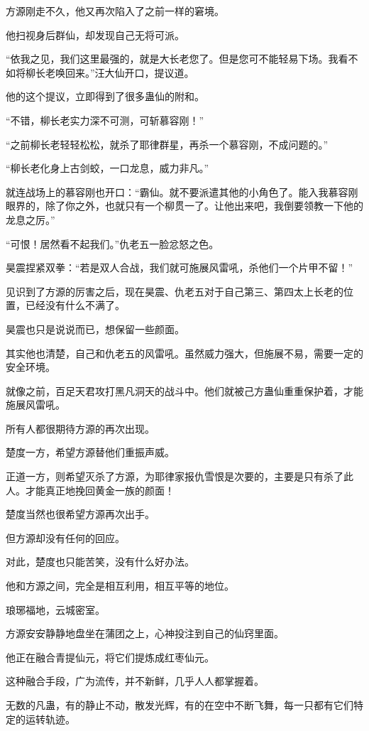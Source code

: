 \begin{this_body}
方源刚走不久，他又再次陷入了之前一样的窘境。

他扫视身后群仙，却发现自己无将可派。

“依我之见，我们这里最强的，就是大长老您了。但是您可不能轻易下场。我看不如将柳长老唤回来。”汪大仙开口，提议道。

他的这个提议，立即得到了很多蛊仙的附和。

“不错，柳长老实力深不可测，可斩慕容刚！”

“之前柳长老轻轻松松，就杀了耶律群星，再杀一个慕容刚，不成问题的。”

“柳长老化身上古剑蛟，一口龙息，威力非凡。”

就连战场上的慕容刚也开口：“霸仙。就不要派遣其他的小角色了。能入我慕容刚眼界的，除了你之外，也就只有一个柳贯一了。让他出来吧，我倒要领教一下他的龙息之厉。”

“可恨！居然看不起我们。”仇老五一脸忿怒之色。

昊震捏紧双拳：“若是双人合战，我们就可施展风雷吼，杀他们一个片甲不留！”

见识到了方源的厉害之后，现在昊震、仇老五对于自己第三、第四太上长老的位置，已经没有什么不满了。

昊震也只是说说而已，想保留一些颜面。

其实他也清楚，自己和仇老五的风雷吼。虽然威力强大，但施展不易，需要一定的安全环境。

就像之前，百足天君攻打黑凡洞天的战斗中。他们就被己方蛊仙重重保护着，才能施展风雷吼。

所有人都很期待方源的再次出现。

楚度一方，希望方源替他们重振声威。

正道一方，则希望灭杀了方源，为耶律家报仇雪恨是次要的，主要是只有杀了此人。才能真正地挽回黄金一族的颜面！

楚度当然也很希望方源再次出手。

但方源却没有任何的回应。

对此，楚度也只能苦笑，没有什么好办法。

他和方源之间，完全是相互利用，相互平等的地位。

琅琊福地，云城密室。

方源安安静静地盘坐在蒲团之上，心神投注到自己的仙窍里面。

他正在融合青提仙元，将它们提炼成红枣仙元。

这种融合手段，广为流传，并不新鲜，几乎人人都掌握着。

无数的凡蛊，有的静止不动，散发光辉，有的在空中不断飞舞，每一只都有它们特定的运转轨迹。


\end{this_body}
